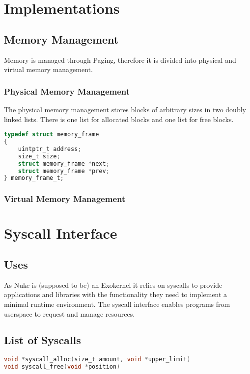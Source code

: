 \documentclass[a4paper,openany]{scrbook}
\begin{document}
\part{Implementations}
\chapter{Memory Management}
Memory is managed through Paging, therefore it is divided into physical
and virtual memory management.
\section{Physical Memory Management}
The physical memory management stores blocks of arbitrary sizes
in two doubly linked lists. There is one list for allocated blocks
and one list for free blocks.

\begin{lstlisting}[basicstyle={\ttfamily},breaklines=true,language=C,numbers=right]
typedef struct memory_frame
{
    uintptr_t address;
    size_t size;
    struct memory_frame *next;
    struct memory_frame *prev;
} memory_frame_t;
\end{lstlisting}
\section{Virtual Memory Management}
\part{Syscall Interface}
\chapter{Uses}
As Nuke is (supposed to be) an Exokernel it relies on syscalls to
provide applications and libraries with the functionality they need
to implement a minimal runtime environment. The syscall interface
enables programs from userspace to request and manage resources.
\chapter{List of Syscalls}
\begin{lstlisting}[basicstyle={\ttfamily},breaklines=true,language=C,numbers=right]
void *syscall_alloc(size_t amount, void *upper_limit)
void syscall_free(void *position)
\end{lstlisting}
\end{document}
